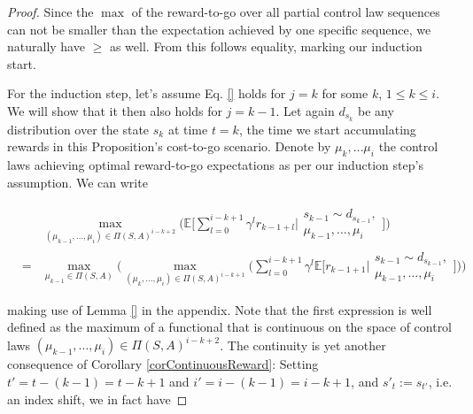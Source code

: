 \documentclass[11pt]{article} %
\begin{document}
\begin{proof}
Since the $\max$ of the reward-to-go over all partial control law sequences can not be smaller than the expectation achieved by one specific sequence, we naturally have $\ge$ as well. From this follows equality, marking our induction start. 

For the induction step, let's assume Eq. \ref{} holds for $j = k$ for some $k$, $1 \le k \le i$. We will show that it then also holds for $j = k - 1$. Let again $d_{s_k}$ be any distribution over the state $s_k$ at time $t = k$, the time we start accumulating rewards in this Proposition's cost-to-go scenario. Denote by $\mu_k,\dots \mu_i$ the control laws achieving optimal reward-to-go expectations as per our induction step's assumption. We can write

\begin{equation}
	\begin{array}{rcl}
			&	&	\max\limits_{(\mu_{k-1},\dots,\mu_i) \in \Pi(S,A)^{i-k+2}} \Big( \mathbb{E} \Big[ \sum\limits_{l=0}^{i-k+1} \gamma^l r_{k-1+l} \Big| \begin{array}{c}
																																						s_{k-1} \sim d_{s_{k-1}}, \\
																																						\mu_{k-1},\dots,\mu_i
																																					\end{array} \Big] \Big) \\
			& = &	\max\limits_{\mu_{k-1} \in \Pi(S,A)} \Big( \max\limits_{(\mu_k,\dots,\mu_i) \in \Pi(S,A)^{i-k+1}} \Big( \sum\limits_{l=0}^{i-k+1} \gamma^l \mathbb{E}\Big[ r_{k-1+1} \Big| 	\begin{array}{c}
																																																s_{k-1} \sim d_{s_{k-1}}, \\
																																																\mu_{k-1},\dots,\mu_i
																																															\end{array} \Big] \Big) \Big)
	\end{array}
\end{equation}

making use of Lemma \ref{} in the appendix. Note that the first expression is well defined as the maximum of a functional that is continuous on the space of control laws $(\mu_{k-1},\dots,\mu_i) \in \Pi(S,A)^{i-k+2}$. The continuity is yet another consequence of Corollary \ref{corContinuousReward}: Setting $t' = t-(k-1) = t - k +1$ and $i' = i - (k-1) = i - k +1$, and $s'_{t} := s_{t'}$, i.e. an index shift, we in fact have


\end{proof}
\end{document}
